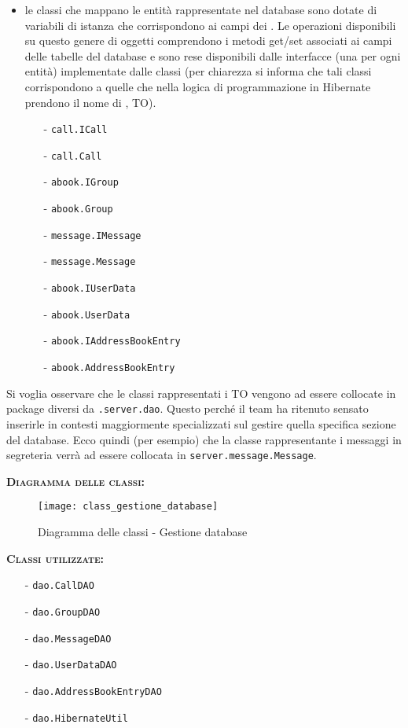 \begin{description}
\begin{itemize}
	\item le classi che mappano le entità rappresentate nel database sono dotate di variabili di istanza che corrispondono ai campi dei . Le operazioni disponibili su questo genere di oggetti comprendono i metodi get/set associati ai campi delle tabelle del database e sono rese disponibili dalle interfacce (una per ogni entità) implementate dalle classi (per chiarezza si informa che tali classi corrispondono a quelle che nella logica di programmazione in Hibernate prendono il nome di , TO\@).
	\begin{itemize}
		\item[-] \texttt{call.ICall}
	  \item[-] \texttt{call.Call}
	  \item[-] \texttt{abook.IGroup}
	  \item[-] \texttt{abook.Group}
	  \item[-] \texttt{message.IMessage}
	  \item[-] \texttt{message.Message}
	  \item[-] \texttt{abook.IUserData}
	  \item[-] \texttt{abook.UserData}
	  \item[-] \texttt{abook.IAddressBookEntry}
	  \item[-] \texttt{abook.AddressBookEntry}
	\end{itemize}
\end{itemize}

Si voglia osservare che le classi rappresentati i TO vengono ad essere collocate in package diversi da \texttt{.server.dao}. Questo perché il team ha ritenuto sensato inserirle in contesti maggiormente specializzati sul gestire quella specifica sezione del database. Ecco quindi (per esempio) che la classe rappresentante i messaggi in segreteria verrà ad essere collocata in \texttt{server.message.Message}.

\item{\scshape\bfseries Diagramma delle classi:}
\begin{figure}[H]
  \centering
  \texttt{[image: class\_gestione\_database]}
  \caption{Diagramma delle classi - Gestione database}\label{fig:gestionedatabase}
\end{figure}

	\item{\scshape\bfseries Classi utilizzate:}
	\begin{itemize}[nolistsep, noitemsep]
	  \item[-] \texttt{dao.CallDAO}
	  \item[-] \texttt{dao.GroupDAO}
	  \item[-] \texttt{dao.MessageDAO}
	  \item[-] \texttt{dao.UserDataDAO}
	  \item[-] \texttt{dao.AddressBookEntryDAO}
	  \item[-] \texttt{dao.HibernateUtil}
	\end{itemize}
\end{description}

